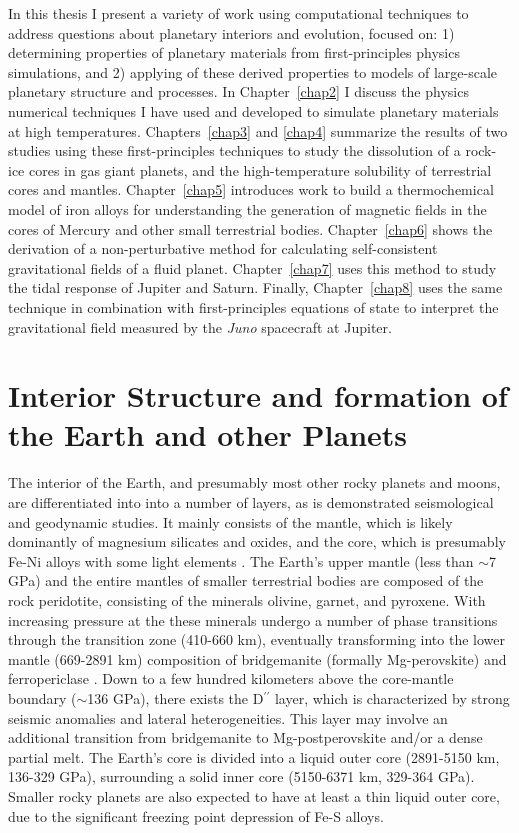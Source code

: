 In this thesis I present a variety of work using computational techniques to
address questions about planetary interiors and evolution, focused on: 1)
determining properties of planetary materials from first-principles physics
simulations, and 2) applying of these derived properties to models of
large-scale planetary structure and processes. In Chapter~\ref{chap2} I discuss
the physics numerical techniques I have used and developed to simulate
planetary materials at high temperatures. Chapters~\ref{chap3} and \ref{chap4}
summarize the results of two studies using these first-principles techniques to
study the dissolution of a rock-ice cores in gas giant planets, and the
high-temperature solubility of terrestrial cores and mantles.
Chapter~\ref{chap5} introduces work to build a thermochemical model of iron 
alloys for understanding the generation of magnetic fields in the cores of
Mercury and other small terrestrial bodies. Chapter~\ref{chap6} shows the 
derivation of a non-perturbative method for calculating self-consistent 
gravitational fields of a fluid planet. Chapter~\ref{chap7} uses this method 
to study the tidal response of Jupiter and Saturn. Finally, Chapter~\ref{chap8}
uses the same technique in combination with first-principles equations of state
to interpret the gravitational field measured by the \textit{Juno} spacecraft 
at Jupiter.

\section{Interior Structure and formation of the Earth and other Planets}

The interior of the Earth, and presumably most other rocky planets and moons,
are differentiated into into a number of layers, as is demonstrated
seismological and geodynamic studies. It mainly consists of the mantle, which
is likely dominantly of magnesium silicates and oxides, and the core, which is
presumably Fe-Ni alloys with some light elements
\cite{Birch1952,Mcdonough1995}.  The Earth's upper mantle (less than $\sim$7
GPa) and the entire mantles of smaller terrestrial bodies are composed of the
rock peridotite, consisting of the minerals olivine, garnet, and pyroxene. With
increasing pressure at the these minerals undergo a number of phase transitions
through the transition zone (410-660 km), eventually transforming into the
lower mantle (669-2891 km) composition of bridgemanite (formally Mg-perovskite)
and ferropericlase \cite{Tronnes2010}.  Down to a few hundred kilometers above
the core-mantle boundary ($\sim$136 GPa), there exists the D$^{\prime\prime}$
layer, which is characterized by strong seismic anomalies and lateral
heterogeneities. This layer may involve an additional transition from
bridgemanite to Mg-postperovskite and/or a dense partial melt.  The Earth's
core is divided into a liquid outer core (2891-5150 km, 136-329 GPa),
surrounding a solid inner core (5150-6371 km, 329-364 GPa). Smaller rocky
planets are also expected to have at least a thin liquid outer core, due to the
significant freezing point depression of Fe-S alloys.

